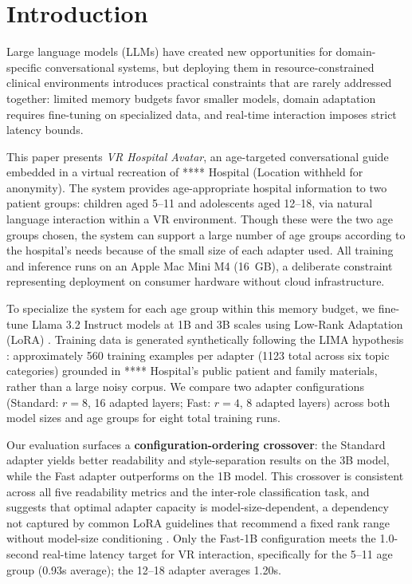 \documentclass[ASNA,twocolumn]{USG} %
\begin{document}

\maketitle

\section{Introduction}\label{sec1}

{L}{arge} language models (LLMs) have created new opportunities for domain-specific conversational systems, but deploying them in resource-constrained clinical environments introduces practical constraints that are rarely addressed together: limited memory budgets favor smaller models, domain adaptation requires fine-tuning on specialized data, and real-time interaction imposes strict latency bounds.

This paper presents \textit{VR Hospital Avatar}, an age-targeted conversational guide embedded in a virtual recreation of **** Hospital (Location withheld for anonymity). The system provides age-appropriate hospital information to two patient groups: children aged 5--11 and adolescents aged 12--18, via natural language interaction within a VR environment. Though these were the two age groups chosen, the system can support a large number of age groups according to the hospital's needs because of the small size of each adapter used. All training and inference runs on an Apple Mac Mini M4 (16~GB), a deliberate constraint representing deployment on consumer hardware without cloud infrastructure.

To specialize the system for each age group within this memory budget, we fine-tune Llama 3.2 Instruct models \cite{dubey2024llama3} at 1B and 3B scales using Low-Rank Adaptation (LoRA) \cite{hu2022lora}. Training data is generated synthetically following the LIMA hypothesis \cite{zhou2023lima}: approximately 560 training examples per adapter (1123 total across six topic categories) grounded in **** Hospital's public patient and family materials, rather than a large noisy corpus. We compare two adapter configurations (Standard: $r = 8$, 16 adapted layers; Fast: $r = 4$, 8 adapted layers) across both model sizes and age groups for eight total training runs.

Our evaluation surfaces a \textbf{configuration-ordering crossover}: the Standard adapter yields better readability and style-separation results on the 3B model, while the Fast adapter outperforms on the 1B model. This crossover is consistent across all five readability metrics and the inter-role classification task, and suggests that optimal adapter capacity is model-size-dependent, a dependency not captured by common LoRA guidelines that recommend a fixed rank range without model-size conditioning \cite{biderman2024lora}. Only the Fast-1B configuration meets the 1.0-second real-time latency target for VR interaction, specifically for the 5--11 age group (0.93s average); the 12--18 adapter averages 1.20s.
\end{document}
